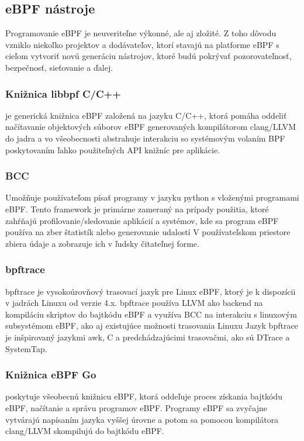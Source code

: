 \subsection{eBPF nástroje}
Programovanie eBPF je neuveriteľne výkonné, ale aj zložité. Z toho dôvodu vzniklo niekoľko projektov a dodávateľov, ktorí stavajú na platforme eBPF s cieľom vytvoriť novú generáciu nástrojov, ktoré budú pokrývať pozorovateľnosť, bezpečnosť, sieťovanie a ďalej.

\subsubsection{Knižnica libbpf C/C++}
je generická knižnica eBPF založená na jazyku C/C++, ktorá pomáha oddeliť načítavanie objektových súborov eBPF generovaných kompilátorom clang/LLVM do jadra a vo všeobecnosti abstrahuje interakciu so systémovým volaním BPF poskytovaním ľahko použiteľných API knižníc pre aplikácie.

\subsubsection{BCC}
Umožňuje používateľom písať programy v jazyku python s vloženými programami eBPF.  
Tento framework je primárne zameraný na prípady použitia, ktoré zahŕňajú profilovanie/sledovanie aplikácií a systémov, kde sa program eBPF používa na zber štatistík alebo generovanie udalostí
V používateľskom priestore zbiera údaje a zobrazuje ich v ľudsky čitateľnej forme. 

\subsubsection{bpftrace}
bpftrace je vysokoúrovňový trasovací jazyk pre Linux eBPF, ktorý je k dispozícii v jadrách Linuxu od verzie 4.x. 
bpftrace používa LLVM ako backend na kompiláciu skriptov do bajtkódu eBPF a využíva BCC na interakciu s linuxovým subsystémom eBPF, ako aj existujúce možnosti trasovania Linuxu
Jazyk bpftrace je inšpirovaný jazykmi awk, C a predchádzajúcimi trasovačmi, ako sú DTrace a SystemTap.

\subsubsection{Knižnica eBPF Go}
poskytuje všeobecnú knižnicu eBPF, ktorá oddeľuje proces získania bajtkódu eBPF, načítanie a správu programov eBPF. 
Programy eBPF sa zvyčajne vytvárajú napísaním jazyka vyššej úrovne a potom sa pomocou kompilátora clang/LLVM skompilujú do bajtkódu eBPF.


